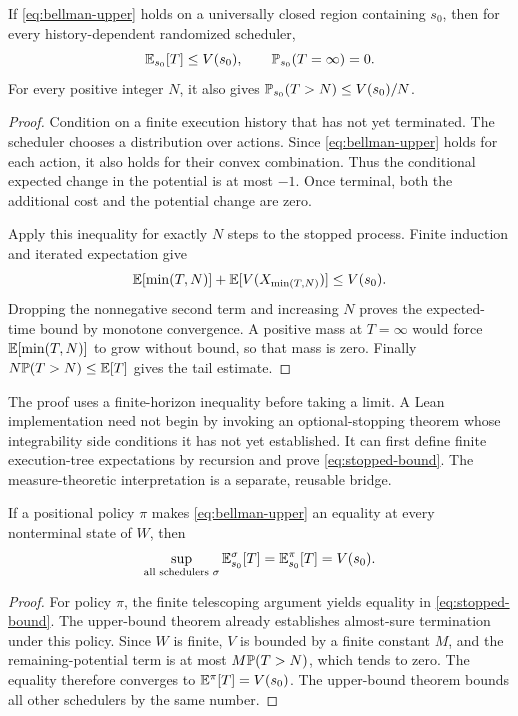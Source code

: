 \begin{theorem}
\label{thm:bellman-upper}
If \eqref{eq:bellman-upper} holds on a universally closed region containing
$s_0$, then for every history-dependent randomized scheduler,
\[
 \mathbb{E}_{s_0}[T]\le V(s_0),\qquad \mathbb{P}_{s_0}(T=\infty)=0.
\]
For every positive integer $N$, it also gives
$\mathbb{P}_{s_0}(T>N)\le V(s_0)/N$.
\end{theorem}
\begin{proof}
Condition on a finite execution history that has not yet terminated.
The scheduler chooses a distribution over actions. Since
\eqref{eq:bellman-upper} holds for each action, it also holds for their
convex combination. Thus the conditional expected change in the potential is
at most $-1$. Once terminal, both the additional cost and the potential change
are zero.

Apply this inequality for exactly $N$ steps to the stopped process. Finite
induction and iterated expectation give
\begin{equation}
 \mathbb{E}[\min(T,N)] + \mathbb{E}[V(X_{\min(T,N)})]\le V(s_0).
 \label{eq:stopped-bound}
\end{equation}
Dropping the nonnegative second term and increasing $N$ proves the expected-time
bound by monotone convergence. A positive mass at $T=\infty$ would force
$\mathbb{E}[\min(T,N)]$ to grow without bound, so that mass is zero. Finally
$N\mathbb{P}(T>N)\le\mathbb{E}[T]$ gives the tail estimate.
\end{proof}

The proof uses a finite-horizon inequality before taking a limit. A Lean
implementation need not begin by invoking an optional-stopping theorem whose
integrability side conditions it has not yet established. It can first define
finite execution-tree expectations by recursion and prove
\eqref{eq:stopped-bound}. The measure-theoretic interpretation is a separate,
reusable bridge.

\begin{theorem}
\label{thm:bellman-tight}
If a positional policy $\pi$ makes \eqref{eq:bellman-upper} an equality at
every nonterminal state of $W$, then
\[
 \sup_{\text{all schedulers }\sigma}\mathbb{E}^\sigma_{s_0}[T]
   =\mathbb{E}^\pi_{s_0}[T]=V(s_0).
\]
\end{theorem}
\begin{proof}
For policy $\pi$, the finite telescoping argument yields equality in
\eqref{eq:stopped-bound}. The upper-bound theorem already establishes almost-sure
termination under this policy. Since $W$ is finite, $V$ is bounded by a finite
constant $M$, and the remaining-potential term is at most
$M\mathbb{P}(T>N)$, which tends to zero. The equality therefore converges to
$\mathbb{E}^\pi[T]=V(s_0)$. The upper-bound theorem bounds all other schedulers by
the same number.
\end{proof}

